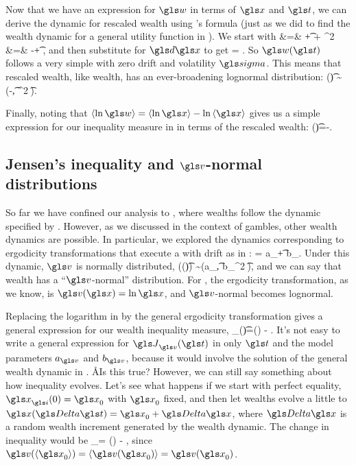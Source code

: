 Now that we have an expression for $\gw$ in terms of $\x$ and $\t$, we can derive the dynamic for rescaled wealth using \Ito's formula (just as we did to find the wealth dynamic for a general utility function in ). We start with
\bea
\gd \gw &=& \frac{\partial \gw}{\partial \t}\gd\t + \frac{\partial \gw}{\partial \x}\gd\x +   \gd\x^2 \\
&=& -\gmu \gw\gd\t + \frac{\gw}{\x}\gd\x {},
\eea
and then substitute  for $\gd\x$ to get
\be
\gd \gw = \gw \gsigma \gd\gW.
\ee
So $\gw(\t)$ follows a very simple \GBM with zero drift and volatility $\gsigma$. This means that rescaled wealth, like wealth, has an ever-broadening lognormal distribution:
\be
\ln \gw(\t) \sim \mathcal{\N}\left(-\t, \gsigma^2 \t\right).
\ee

Finally, noting that $\ave{\ln \gw}=\ave{\ln \x}-\ln\ave{\x}$ gives us a simple expression for our inequality measure in  in terms of the rescaled wealth:
\be
\J(\t)=-\ave{\ln \gw}.
\ee


\subsection{Jensen's inequality and $\gv$-normal distributions}
So far we have confined our analysis to \GBM, where wealths follow the dynamic specified by . However, as we discussed in the context of gambles, other wealth dynamics are possible. In particular, we explored the dynamics corresponding to ergodicity transformations that execute a \BM with drift as in :
\be
\gd\gv = a_\gv \gd\t + b_\gv \gd\gW.
\ee
Under this dynamic, $\gv$ is normally distributed,
\be
\gv(\x(\t)) \sim \mathcal{\N}\left(a_\gv\t, {b_\gv}^2 \t\right),
\ee
and we can say that wealth has a ``$\gv$-normal'' distribution. For \GBM, the ergodicity transformation, as we know, is $\gv(\x)=\ln \x$, and $\gv$-normal becomes lognormal.

Replacing the logarithm in  by the general ergodicity transformation gives a general expression for our wealth inequality measure,
\be
\J_\gv(\t)=\gv(\ave{\x(\t)}) - \ave{\gv(\x(\t))}.
\ee
It's not easy to write a general expression for $\J_\gv(\t)$ in only $\t$ and the model parameters $a_\gv$ and $b_\gv$, because it would involve the solution of the general wealth dynamic in . \AA{Is this true?} However, we can still say something about how inequality evolves. Let's see what happens if we start with perfect equality, $\x_\gi(0)=\x_0$ with $\x_0$ fixed, and then let wealths evolve a little to $\x(\D \t)=\x_0+\D \x$, where $\D \x$ is a random wealth increment generated by the wealth dynamic. The change in inequality would be
\be
\D \J_\gv = \gv() - ,
\ee
since $\gv(\ave{\x_0})=\ave{\gv(\x_0)}=\gv(\x_0)$.

